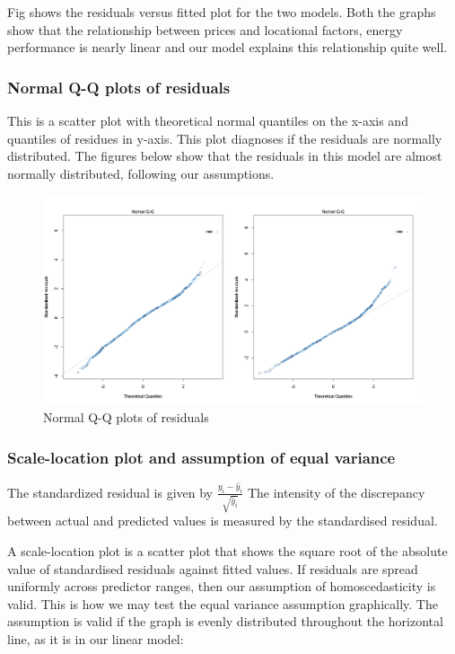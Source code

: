 \documentclass[12pt]{article}
\begin{document}
Fig shows the residuals versus fitted plot for the two models. Both the graphs show that the relationship between prices and locational factors, energy performance is nearly linear and our model explains this relationship quite well.

\subsubsection{Normal Q-Q plots of residuals}
This is a scatter plot with theoretical normal quantiles on the x-axis and quantiles of residues in y-axis. This plot diagnoses if the residuals are normally distributed. The figures below show that the residuals in this model are almost normally distributed, following our assumptions.


\begin{figure}[H]
    \centering
    \includegraphics[width=18cm]{3.3 images/3.3.2plot.png}
    \caption{Normal Q-Q plots of residuals}
    \label{fig:qq}
\end{figure}

\subsubsection{Scale-location plot and assumption of equal variance}
The standardized residual is given by $\frac{y_i-\hat y_i}{\sqrt{\hat y_i}}$
The intensity of the discrepancy between actual and predicted values is measured by the standardised residual.

A scale-location plot is a scatter plot that shows the square root of the absolute value of standardised residuals against fitted values.
If residuals are spread uniformly across predictor ranges, then our assumption of homoscedasticity is valid.
This is how we may test the equal variance assumption graphically. The assumption is valid if the graph is evenly distributed throughout the horizontal line, as it is in our linear model:
\end{document}
